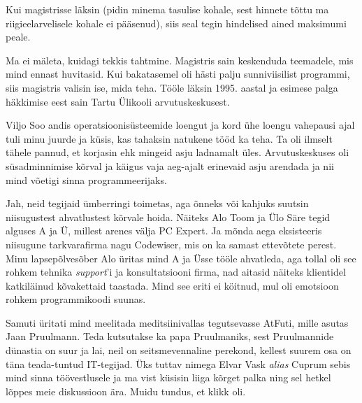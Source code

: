 Kui magistrisse läksin (pidin minema tasulise kohale, sest 
hinnete tõttu ma riigieelarvelisele kohale ei pääsenud), siis seal tegin
hindelised ained maksimumi peale. 


Ma ei mäleta, kuidagi tekkis tahtmine. Magistris sain keskenduda 
teemadele, mis mind ennast huvitasid. Kui bakatasemel oli hästi palju 
sunniviisilist programmi, siis magistris valisin ise, mida teha. Tööle 
läksin 1995. aastal ja esimese palga häkkimise eest sain Tartu 
Ülikooli arvutuskeskusest. 

Viljo Soo andis operatsioonisüsteemide loengut ja kord 
ühe loengu vahepausi ajal tuli minu juurde ja küsis, kas tahaksin natukene tööd ka teha. Ta oli ilmselt 
tähele pannud, et korjasin ehk
mingeid asju ladnamalt üles. Arvutuskeskuses oli süsadminnimise 
kõrval ja käigus vaja aeg-ajalt erinevaid asju arendada ja nii mind võetigi 
sinna programmeerijaks. 


Jah, neid tegijaid ümberringi toimetas, aga 
õnneks või kahjuks suutsin niisugustest ahvatlustest kõrvale hoida. Näiteks Alo Toom ja Ülo Säre tegid alguses A ja Ü, millest arenes välja PC 
Expert. Ja mõnda aega eksisteeris niisugune tarkvarafirma 
nagu Codewiser, mis on ka samast ettevõtete perest. Minu lapsepõlvesõber Alo üritas mind A ja Üsse tööle ahvatleda, 
aga tollal oli see rohkem tehnika \emph{support}'i ja konsultatsiooni 
firma, nad aitasid näiteks klientidel katkiläinud kõvakettaid taastada. Mind see eriti ei köitnud, mul oli emotsioon rohkem 
programmikoodi suunas. 

Samuti üritati mind meelitada meditsiinivallas tegutsevasse 
AtFuti, mille asutas Jaan 
Pruulmann. Teda kutsutakse ka
papa Pruulmaniks, sest Pruulmannide dünastia on suur ja 
lai, neil on seitsmevennaline perekond, kellest suurem osa on täna 
teada-tuntud IT-tegijad. Üks tuttav nimega Elvar Vask \emph{alias} 
Cuprum sebis mind sinna 
töövestlusele ja ma vist küsisin liiga kõrget 
palka ning sel hetkel lõppes meie diskussioon ära. Muidu tundus, et klikk oli. 


